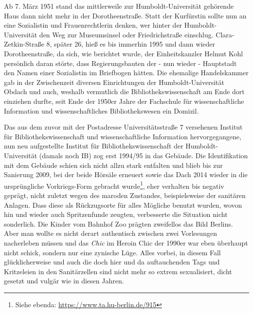 \documentclass[a4paper,
fontsize=11pt,
oneside,
numbers=noperiodatend,
parskip=half-,
bibliography=totoc,
final
]{scrartcl}
\begin{document}
Ab 7. März 1951 stand das mittlerweile zur Humboldt-Universität
gehörende Haus dann nicht mehr in der Dorotheenstraße. Statt der
Kurfürstin sollte nun an eine Sozialistin und Frauenrechtlerin denken,
wer hinter der Humboldt-Universität den Weg zur Museumsinsel oder
Friedrichstraße einschlug. Clara-Zetkin-Straße 8, später 26, hieß es bis
immerhin 1995 und dann wieder Dorotheenstraße, da sich, wie berichtet
wurde, der Einheitskanzler Helmut Kohl persönlich daran störte, dass
Regierungsbauten der - nun wieder - Hauptstadt den Namen einer
Sozialistin im Briefbogen hätten. Die ehemalige Handelskammer gab in der
Zwischenzeit diversen Einrichtungen der Humboldt-Universität Obdach und
auch, weshalb vermutlich die Bibliothekswissenschaft am Ende dort
einziehen durfte, seit Ende der 1950er Jahre der Fachschule für
wissenschaftliche Information und wissenschaftliches Bibliothekswesen
ein Domizil.

Das aus dem zuvor mit der Postadresse Universitätsstraße 7 versehenen
Institut für Bibliothekswissenschaft und wissenschaftliche Information
hervorgegangene, nun neu aufgestellte Institut für
Bibliothekswissenschaft der Humboldt-Universität (damals noch IB) zog
erst 1994/95 in das Gebäude. Die Identifikation mit dem Gebäude schien
sich nicht allzu stark entfalten und blieb bis zur Sanierung 2009, bei
der beide Hörsäle erneuert sowie das Dach 2014 wieder in die
ursprüngliche Vorkriegs-Form gebracht wurde\footnote{Siehe ebenda:
  \url{https://www.ta.hu-berlin.de/915}}, eher verhalten bis negativ
geprägt, nicht zuletzt wegen des maroden Zustandes, beispielsweise der
sanitären Anlagen. Dass diese als Rückzugsorte für alles Mögliche
benutzt wurden, wovon hin und wieder auch Spritzenfunde zeugten,
verbesserte die Situation nicht sonderlich. Die Kinder vom Bahnhof Zoo
prägten zweifellos das Bild Berlins. Aber man wollte es nicht derart
authentisch zwischen zwei Vorlesungen nacherleben müssen und das
\emph{Chic} im Heroin Chic der 1990er war eben überhaupt nicht schick,
sondern nur eine zynische Lüge. Alles vorbei, in diesem Fall
glücklicherweise und auch die doch hier und da auftauchenden Tags und
Kritzeleien in den Sanitärzellen sind nicht mehr so extrem sexualisiert,
dicht gesetzt und vulgär wie in diesen Jahren.
\end{document}
